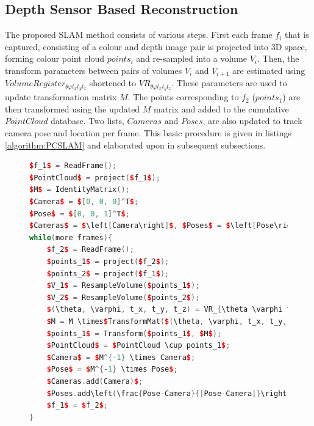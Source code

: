 
\subsection{Depth Sensor Based Reconstruction}

\label{METHOD_SECLL}
The proposed SLAM method consists of various steps. First each frame $f_i$ that is captured, consisting of a colour and depth image pair is projected into 3D space, forming colour point cloud $points_i$ and re-sampled into a volume $V_i$. Then, the transform parameters between pairs of volumes $V_i$ and $V_{i+1}$ are estimated using $VolumeRegister_{\theta \varphi t_x t_y t_z}$ shortened to $VR_{\theta \varphi t_x t_y t_z}$. These parameters are used to update transformation matrix $M$. The points corresponding to $f_2$ ($points_1$) are then transformed using the updated $M$ matrix and added to the cumulative $PointCloud$ database. Two lists, $Cameras$ and $Poses$, are also updated to track camera pose and location per frame. This basic procedure is given in listings \ref{algorithm:PCSLAM} and elaborated upon in subsequent subsections.
\begin{figure}
\begin{lstlisting}[language=c++,caption=Phase Correlation Based SLAM Algorithm,label=algorithm:PCSLAM,mathescape,basicstyle=\ttfamily]
$f_1$ = ReadFrame();
$PointCloud$ = project($f_1$);
$M$ = IdentityMatrix();
$Camera$ = $[0, 0, 0]^T$;
$Pose$ = $[0, 0, 1]^T$;
$Cameras$ = $\left[Camera\right]$, $Poses$ = $\left[Pose\right]$;
while(more frames){
	$f_2$ = ReadFrame();
	$points_1$ = project($f_2$);
	$points_2$ = project($f_1$);
	$V_1$ = ResampleVolume($points_1$);
	$V_2$ = ResampleVolume($points_2$);
	$(\theta, \varphi, t_x, t_y, t_z) = VR_{\theta \varphi t_x t_y t_z}(V_1, V_2)$;
	$M = M \times$TransformMat($(\theta, \varphi, t_x, t_y, t_z)$);
	$points_1$ = Transform($points_1$, $M$);
	$PointCloud$ = $PointCloud \cup points_1$;
	$Camera$ = $M^{-1} \times Camera$;
	$Pose$ = $M^{-1} \times Pose$;
	$Cameras.add(Camera)$;
	$Poses.add\left(\frac{Pose-Camera}{|Pose-Camera|}\right)$;
	$f_1$ = $f_2$;
}
\end{lstlisting}
\end{figure}


